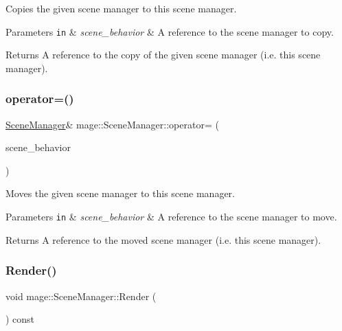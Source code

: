 Copies the given scene manager to this scene manager.


\begin{DoxyParams}[1]{Parameters}
\mbox{\tt in}  & {\em scene\+\_\+behavior} & A reference to the scene manager to copy. \\
\hline
\end{DoxyParams}
\begin{DoxyReturn}{Returns}
A reference to the copy of the given scene manager (i.\+e. this scene manager). 
\end{DoxyReturn}
\hypertarget{classmage_1_1_scene_manager_a5f2e494edeb329e54a928a1bc0f5f7df}{}\label{classmage_1_1_scene_manager_a5f2e494edeb329e54a928a1bc0f5f7df} 
\subsubsection{\texorpdfstring{operator=()}{operator=()}\hspace{0.1cm}{\footnotesize\ttfamily [2/2]}}
{\footnotesize\ttfamily \hyperlink{classmage_1_1_scene_manager}{Scene\+Manager}\& mage\+::\+Scene\+Manager\+::operator= (\begin{DoxyParamCaption}\item[{\hyperlink{classmage_1_1_scene_manager}{Scene\+Manager} \&\&}]{scene\+\_\+behavior }\end{DoxyParamCaption})\hspace{0.3cm}{\ttfamily [delete]}}

Moves the given scene manager to this scene manager.


\begin{DoxyParams}[1]{Parameters}
\mbox{\tt in}  & {\em scene\+\_\+behavior} & A reference to the scene manager to move. \\
\hline
\end{DoxyParams}
\begin{DoxyReturn}{Returns}
A reference to the moved scene manager (i.\+e. this scene manager). 
\end{DoxyReturn}
\hypertarget{classmage_1_1_scene_manager_a05c854e957e3f78e243efe3e422955a6}{}\label{classmage_1_1_scene_manager_a05c854e957e3f78e243efe3e422955a6} 
\subsubsection{\texorpdfstring{Render()}{Render()}}
{\footnotesize\ttfamily void mage\+::\+Scene\+Manager\+::\+Render (\begin{DoxyParamCaption}{ }\end{DoxyParamCaption}) const}

